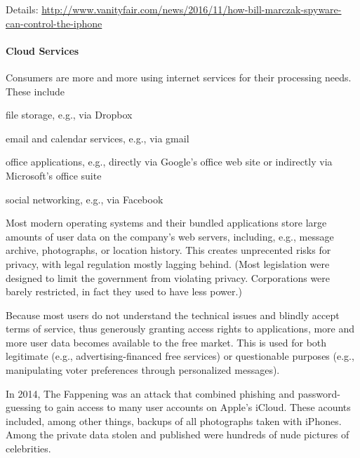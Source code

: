 Details: \url{http://www.vanityfair.com/news/2016/11/how-bill-marczak-spyware-can-control-the-iphone}

\paragraph{Cloud Services}
Consumers are more and more using internet services for their processing needs.
These include
\begin{compactitem}
\item file storage, e.g., via Dropbox
\item email and calendar services, e.g., via gmail
\item office applications, e.g., directly via Google's office web site or indirectly via Microsoft's office suite
\item social networking, e.g., via Facebook
\end{compactitem}
Most modern operating systems and their bundled applications store large amounts of user data on the company's web servers, including, e.g., message archive, photographs, or location history.
This creates unprecented risks for privacy, with legal regulation mostly lagging behind.
(Most legislation were designed to limit the government from violating privacy.
Corporations were barely restricted, in fact they used to have less power.)

Because most users do not understand the technical issues and blindly accept terms of service, thus generously granting access rights to applications, more and more user data becomes available to the free market.
This is used for both legitimate (e.g., advertising-financed free services) or questionable purposes (e.g., manipulating voter preferences through personalized messages).

In 2014, The Fappening was an attack that combined phishing and password-guessing to gain access to many user accounts on Apple's iCloud.
These acounts included, among other things, backups of all photographs taken with iPhones.
Among the private data stolen and published were hundreds of nude pictures of celebrities.

